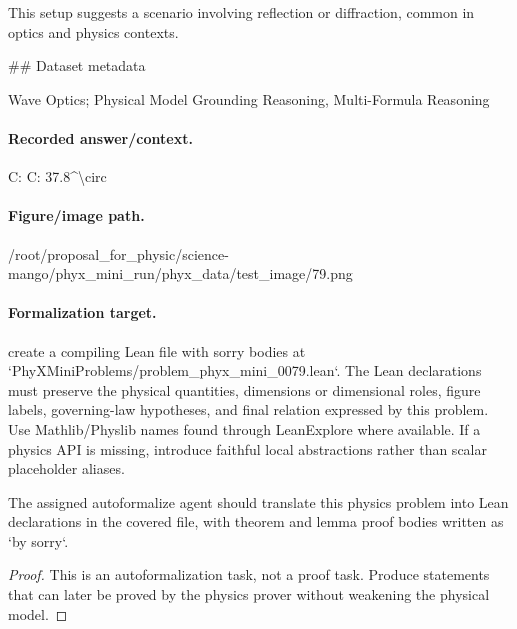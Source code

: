 This setup suggests a scenario involving reflection or diffraction, common in optics and physics contexts.

\#\# Dataset metadata

Wave Optics; Physical Model Grounding Reasoning, Multi-Formula Reasoning

\paragraph{Recorded answer/context.}
C: C: 37.8\textasciicircum{}\textbackslash{}circ

\paragraph{Figure/image path.}
/root/proposal\_for\_physic/science-mango/phyx\_mini\_run/phyx\_data/test\_image/79.png

\paragraph{Formalization target.}
create a compiling Lean file with sorry bodies at `PhyXMiniProblems/problem\_phyx\_mini\_0079.lean`. The Lean declarations must preserve the physical quantities, dimensions or dimensional roles, figure labels, governing-law hypotheses, and final relation expressed by this problem.
Use Mathlib/Physlib names found through LeanExplore where available. If a physics API is missing, introduce faithful local abstractions rather than scalar placeholder aliases.

\begin{theorem}
\label{thm:physics:phyx_mini_0079:target}
The assigned autoformalize agent should translate this physics problem into Lean declarations in the covered file, with theorem and lemma proof bodies written as `by sorry`.
\end{theorem}
\begin{proof}
This is an autoformalization task, not a proof task. Produce statements that can later be proved by the physics prover without weakening the physical model.
\end{proof}

